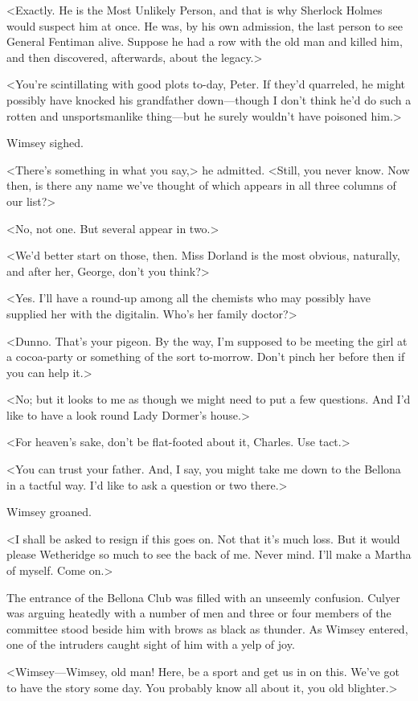 <Exactly. He is the Most Unlikely Person, and that is why Sherlock Holmes would suspect him at once. He was, by his own admission, the last person to see General Fentiman alive. Suppose he had a row with the old man and killed him, and then discovered, afterwards, about the legacy.>

<You're scintillating with good plots to-day, Peter. If they'd quarreled, he might possibly have knocked his grandfather down—though I don't think he'd do such a rotten and unsportsmanlike thing—but he surely wouldn't have poisoned him.>

Wimsey sighed.

<There's something in what you say,> he admitted. <Still, you never know. Now then, is there any name we've thought of which appears in all three columns of our list?>

<No, not one. But several appear in two.>

<We'd better start on those, then. Miss Dorland is the most obvious, naturally, and after her, George, don't you think?>

<Yes. I'll have a round-up among all the chemists who may possibly have supplied her with the digitalin. Who's her family doctor?>

<Dunno. That's your pigeon. By the way, I'm supposed to be meeting the girl at a cocoa-party or something of the sort to-morrow. Don't pinch her before then if you can help it.>

<No; but it looks to me as though we might need to put a few questions. And I'd like to have a look round Lady Dormer's house.>

<For heaven's sake, don't be flat-footed about it, Charles. Use tact.>

<You can trust your father. And, I say, you might take me down to the Bellona in a tactful way. I'd like to ask a question or two there.>

Wimsey groaned.

<I shall be asked to resign if this goes on. Not that it's much loss. But it would please Wetheridge so much to see the back of me. Never mind. I'll make a Martha of myself. Come on.>

The entrance of the Bellona Club was filled with an unseemly confusion. Culyer was arguing heatedly with a number of men and three or four members of the committee stood beside him with brows as black as thunder. As Wimsey entered, one of the intruders caught sight of him with a yelp of joy.

<Wimsey—Wimsey, old man! Here, be a sport and get us in on this. We've got to have the story some day. You probably know all about it, you old blighter.>

